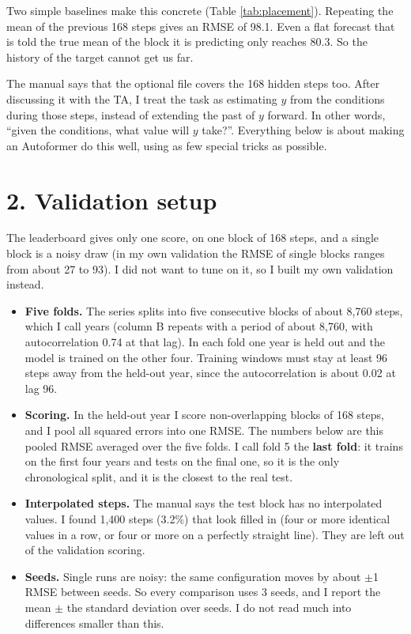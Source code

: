 \documentclass[11pt,letterpaper]{article}
\begin{document}
Two simple baselines make this concrete (Table \ref{tab:placement}). Repeating the mean of the previous 168 steps gives an RMSE of 98.1. Even a flat forecast that is told the true mean of the block it is predicting only reaches 80.3. So the history of the target cannot get us far.

The manual says that the optional file covers the 168 hidden steps too. After discussing it with the TA, I treat the task as {estimating $y$ from the conditions during those steps}, instead of extending the past of $y$ forward. In other words, ``given the conditions, what value will $y$ take?''. Everything below is about making an Autoformer do this well, using as few special tricks as possible.


\section*{2. Validation setup}

The leaderboard gives only one score, on one block of 168 steps, and a single block is a noisy draw (in my own validation the RMSE of single blocks ranges from about 27 to 93). I did not want to tune on it, so I built my own validation instead.

\begin{itemize}
\item \textbf{Five folds.} The series splits into five consecutive blocks of about 8{,}760 steps, which I call years (column B repeats with a period of about 8{,}760, with autocorrelation 0.74 at that lag). In each fold one year is held out and the model is trained on the other four. Training windows must stay at least 96 steps away from the held-out year, since the autocorrelation is about 0.02 at lag 96.
\item \textbf{Scoring.} In the held-out year I score non-overlapping blocks of 168 steps, and I pool all squared errors into one RMSE. The numbers below are this pooled RMSE averaged over the five folds. I call fold 5 the \textbf{last fold}: it trains on the first four years and tests on the final one, so it is the only chronological split, and it is the closest to the real test.
\item \textbf{Interpolated steps.} The manual says the test block has no interpolated values. I found 1{,}400 steps (3.2\%) that look filled in (four or more identical values in a row, or four or more on a perfectly straight line). They are left out of the validation scoring.
\item \textbf{Seeds.} Single runs are noisy: the same configuration moves by about $\pm$1 RMSE between seeds. So every comparison uses 3 seeds, and I report the mean $\pm$ the standard deviation over seeds. I do not read much into differences smaller than this.
\end{itemize}
\end{document}

